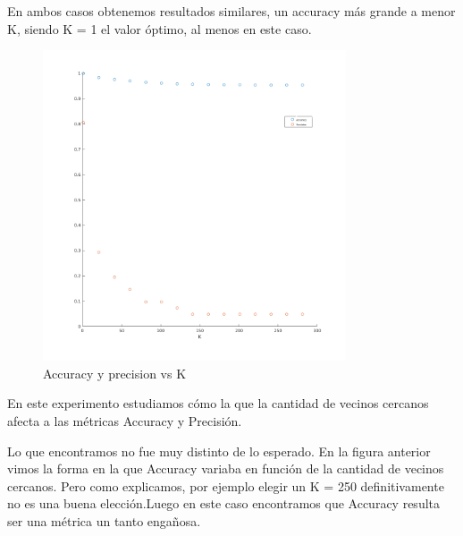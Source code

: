 En ambos casos obtenemos resultados similares, un accuracy más grande a menor K, siendo K = 1 el valor óptimo, al menos en este caso.

\begin{figure}[H]
	\centering	
	\includegraphics[width=0.8\textwidth]{img/acu_pre.png}
	\caption{Accuracy y precision vs K}
	\label{fig: Accuracy y precision vs K con KNN}
\end{figure}

En este experimento estudiamos cómo la que la cantidad de vecinos cercanos afecta a las métricas Accuracy y Precisión.

Lo que encontramos no fue muy distinto de lo esperado. En la figura anterior vimos la forma en la que Accuracy variaba en función de la cantidad de vecinos cercanos. Pero como explicamos, por ejemplo elegir un K = 250 definitivamente no es una buena elección.Luego en este caso encontramos que Accuracy resulta ser una métrica un tanto engañosa.

